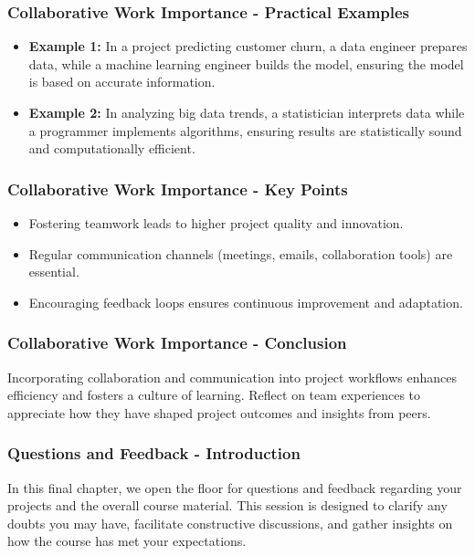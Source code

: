 \documentclass[aspectratio=169]{beamer}
\begin{document}
\begin{frame}[fragile]
    \frametitle{Collaborative Work Importance - Practical Examples}
    \begin{itemize}
        \item \textbf{Example 1:} In a project predicting customer churn, a data engineer prepares data, while a machine learning engineer builds the model, ensuring the model is based on accurate information.
        
        \item \textbf{Example 2:} In analyzing big data trends, a statistician interprets data while a programmer implements algorithms, ensuring results are statistically sound and computationally efficient.
    \end{itemize}
\end{frame}

\begin{frame}[fragile]
    \frametitle{Collaborative Work Importance - Key Points}
    \begin{itemize}
        \item Fostering teamwork leads to higher project quality and innovation.
        \item Regular communication channels (meetings, emails, collaboration tools) are essential.
        \item Encouraging feedback loops ensures continuous improvement and adaptation.
    \end{itemize}
\end{frame}

\begin{frame}[fragile]
    \frametitle{Collaborative Work Importance - Conclusion}
    Incorporating collaboration and communication into project workflows enhances efficiency and fosters a culture of learning. Reflect on team experiences to appreciate how they have shaped project outcomes and insights from peers.
\end{frame}

\begin{frame}[fragile]
  \frametitle{Questions and Feedback - Introduction}
  In this final chapter, we open the floor for questions and feedback regarding your projects and the overall course material. This session is designed to clarify any doubts you may have, facilitate constructive discussions, and gather insights on how the course has met your expectations.
\end{frame}
\end{document}
